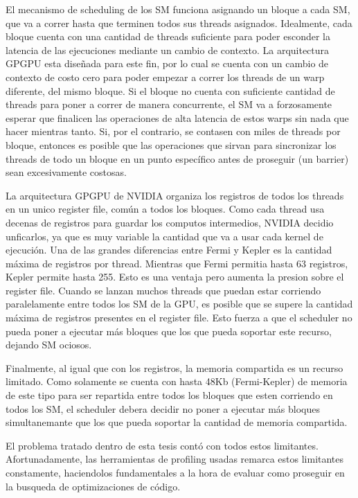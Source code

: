 El mecanismo de scheduling de los SM funciona asignando un bloque a cada SM, que
va a correr hasta que terminen todos sus threads asignados. Idealmente, cada
bloque cuenta con una cantidad de threads suficiente para poder esconder la latencia
de las ejecuciones mediante un cambio de contexto. La arquitectura GPGPU esta dise\~nada
para este fin, por lo cual se cuenta con un cambio de contexto de costo cero para
poder empezar a correr los threads de un warp diferente, del mismo bloque.
Si el bloque no cuenta con suficiente cantidad de threads para poner a correr de manera
concurrente, el SM va a forzosamente esperar que finalicen las operaciones de alta latencia
de estos warps sin nada que hacer mientras tanto. Si, por el contrario, se contasen con
miles de threads por bloque, entonces es posible que las operaciones que sirvan
para sincronizar los threads de todo un bloque en un punto espec\'ifico antes de proseguir
(un barrier) sean excesivamente costosas.

La arquitectura GPGPU de NVIDIA organiza los registros de todos los threads en un unico
register file, com\'un a todos los bloques. Como cada thread usa decenas de registros para guardar
los computos intermedios, NVIDIA decidio unficarlos, ya que es muy variable la cantidad que va a usar
cada kernel de ejecuci\'on. Una de las grandes diferencias entre Fermi y Kepler es la cantidad m\'axima de
registros por thread. Mientras que Fermi permitia hasta 63 registros, Kepler permite hasta 255. Esto
es una ventaja pero aumenta la presion sobre el register file. Cuando se lanzan muchos threads
que puedan estar corriendo paralelamente entre todos los SM de la GPU, es posible que se supere
la cantidad m\'axima de registros presentes en el register file. Esto fuerza a que el scheduler
no pueda poner a ejecutar m\'as bloques que los que pueda soportar este recurso, dejando SM ociosos.

Finalmente, al igual que con los registros, la memoria compartida es un recurso limitado. Como
solamente se cuenta con hasta 48Kb (Fermi-Kepler) de memoria de este tipo para ser repartida entre
todos los bloques que esten corriendo en todos los SM, el scheduler debera decidir no poner a ejecutar
m\'as bloques simultanemante que los que pueda soportar la cantidad de memoria compartida.

El problema tratado dentro de esta tesis cont\'o con todos estos limitantes. Afortunadamente,
las herramientas de profiling usadas remarca estos limitantes constamente, haciendolos
fundamentales a la hora de evaluar como proseguir en la busqueda de optimizaciones de c\'odigo.

